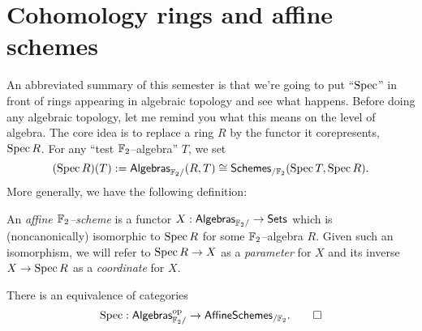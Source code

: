 \section{Cohomology rings and affine schemes}

An abbreviated summary of this semester is that we're going to put ``$\operatorname{Spec}$'' in front of rings appearing in algebraic topology and see what happens.  Before doing any algebraic topology, let me remind you what this means on the level of algebra.  The core idea is to replace a ring $R$ by the functor it corepresents, $\operatorname{Spec} R$.  For any ``test $\mathbb F_2$--algebra'' $T$, we set \[(\operatorname{Spec} R)(T) := \mathsf{Algebras}_{\mathbb F_2/}(R, T) \cong \mathsf{Schemes}_{/\mathbb F_2}(\operatorname{Spec} T, \operatorname{Spec} R).\]  More generally, we have the following definition:
\begin{definition}
An \textit{affine $\mathbb F_2$--scheme} is a functor $X: \mathsf{Algebras}_{\mathbb F_2/} \to \mathsf{Sets}$ which is (noncanonically) isomorphic to $\operatorname{Spec} R$ for some $\mathbb F_2$--algebra $R$.  Given such an isomorphism, we will refer to $\operatorname{Spec} R \to X$ as a \textit{parameter} for $X$ and its inverse $X \to \operatorname{Spec} R$ as a \textit{coordinate} for $X$.
\end{definition}

\begin{lemma}
There is an equivalence of categories \[\operatorname{Spec}: \mathsf{Algebras}_{\mathbb F_2/}^{\mathrm{op}} \to \mathsf{AffineSchemes}_{/\mathbb F_2}. \qed\]
\end{lemma}


